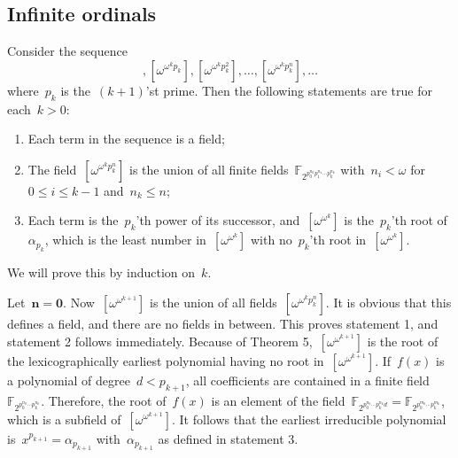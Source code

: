 \subsection{Infinite ordinals}
Consider the sequence
\begin{equation}
  [\omega^{\omega^k}], [\omega^{\omega^k p_k}], [\omega^{\omega^k p_k^2}], \dotsc, [\omega^{\omega^k p_k^n}], \dotsc 
\end{equation}
where~$p_k$ is the~$(k+1)$'st prime. Then the following statements are true for each~$k > 0$:
\begin{enumerate}
  \item Each term in the sequence is a field;
	\item The field~$[\omega^{\omega^k p_k^n}]$ is the union of all finite fields~$\mathbb{F}_{2^{p_0^{n_0} p_1^{n_1} \dotsm p_k^{n_k}}}$ with~$n_i < \omega$ for~$0 \leq i \leq k - 1$ and~$n_k \leq n$;
	\item Each term is the~$p_k$'th power of its successor, and~$[\omega^{\omega^k}]$ is the~$p_k$'th root of~$\alpha_{p_k}$, which is the least number in~$[\omega^{\omega^k}]$ with no~$p_k$'th root in~$[\omega^{\omega^k}]$.
\end{enumerate}
We will prove this by induction on~$k$.

Let~$\boldsymbol{n = 0}$. Now~$[\omega^{\omega^{k+1}}]$ is the union of all fields~$[\omega^{\omega^k p_k^n}]$. It is obvious that this defines a field, and there are no fields in between. This proves statement 1, and statement 2 follows immediately. Because of Theorem 5,~$[\omega^{\omega^{k+1}}]$ is the root of the lexicographically earliest polynomial having no root in~$[\omega^{\omega^{k+1}}]$. If~$f(x)$ is a polynomial of degree~$d < p_{k+1}$, all coefficients are contained in a finite field~$\mathbb{F}_{2^{p_0^{n_0} \dotsm p_k^{n_k}}}$. Therefore, the root of~$f(x)$ is an element of the field~$\mathbb{F}_{2^{p_0^{n_0} \dotsm p_k^{n_k} d}} = \mathbb{F}_{2^{p_0^{m_0} \dotsm p_k^{m_k}}}$, which is a subfield of~$[\omega^{\omega^{k+1}}]$. It follows that the earliest irreducible polynomial is~$x^{p_{k+1}} = \alpha_{p_{k+1}}$ with~$\alpha_{p_{k+1}}$ as defined in statement 3.

